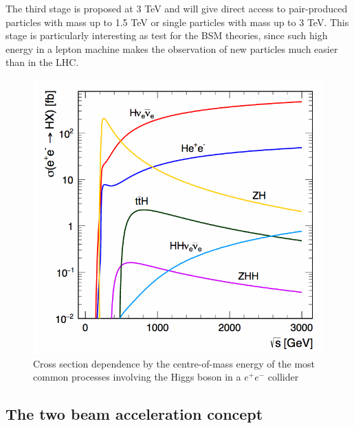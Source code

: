 The third stage is proposed at 3 TeV and will give direct access to pair-produced particles with mass up to 1.5 TeV or single particles with mass up to 3 TeV. This stage is particularly interesting as test for the BSM theories, since such high energy in a lepton machine makes the observation of new particles much easier than in the LHC.

\begin{figure}
\centering

\includegraphics[scale=0.35]{pictures/higgs_cs}
\caption{Cross section dependence by the centre-of-mass energy of the most common processes involving the Higgs boson in a $e^+ e^-$ collider}
\label{higgs_cs}
\end{figure}






\subsection{The two beam acceleration concept}

